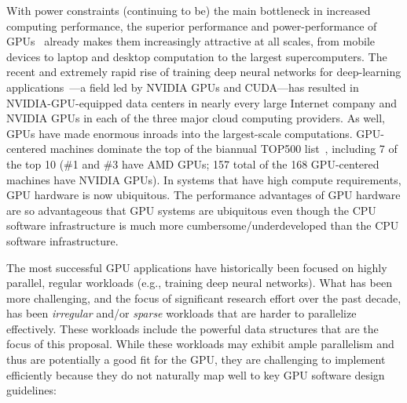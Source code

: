 
With power constraints (continuing to be) the main bottleneck in increased computing performance, the superior performance and power-performance of GPUs~\cite{Dally:2010:GCT,Dally:2021:EOT} already makes them increasingly attractive at all scales, from mobile devices to laptop and desktop computation to the largest supercomputers. The recent and extremely rapid rise of training deep neural networks for deep-learning applications~\cite{Amodei:2015:DS2,Chetlur:2014:CEP,Coates:2013:DLW,Hannun:2014:DSU}---a field led by NVIDIA GPUs and CUDA---has resulted in NVIDIA-GPU-equipped data centers in nearly every large Internet company and NVIDIA GPUs in each of the three major cloud computing providers. As well, GPUs have made enormous inroads into the largest-scale computations. GPU-centered machines dominate the top of the biannual TOP500 list~\cite{top500:nov2022}, including 7 of the top 10 (\#1 and \#3 have AMD GPUs; 157 total of the 168 GPU-centered machines have NVIDIA GPUs). In systems that have high compute requirements, GPU hardware is now ubiquitous. 
%
%
The performance advantages  of GPU hardware are so advantageous that GPU systems are ubiquitous even though the  
CPU software infrastructure is much more cumbersome/underdeveloped than the CPU software infrastructure. 


The most successful GPU applications have historically been focused on highly parallel, regular workloads (e.g., training deep neural networks). What has been more challenging, and the focus of significant research effort over the past decade, has been \emph{irregular} and/or \emph{sparse} workloads that are harder to parallelize effectively. These workloads include the powerful data structures that are the focus of this proposal. While these workloads may exhibit ample parallelism and thus are potentially a good fit for the GPU, they are challenging to implement efficiently because they do not naturally map well to key GPU software design guidelines:

